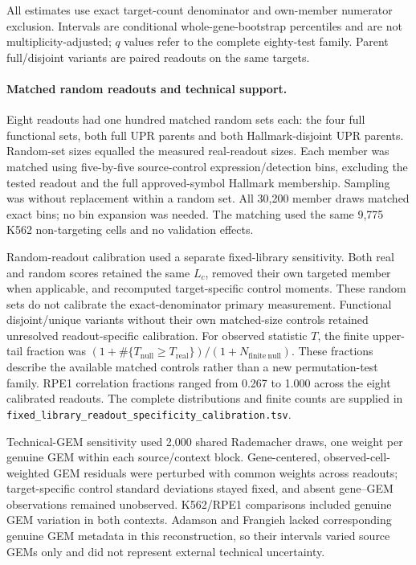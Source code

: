 \documentclass[a4paper,fleqn]{cas-sc}
\makeatletter
\DeclareRobustCommand{\rev}[1]{{\color{red}\def\@citecolor{black}\def\@linkcolor{red}\def\@urlcolor{red}#1}}
\makeatother
\begin{document}
\rev{All estimates use exact target-count denominator and own-member numerator exclusion.} \rev{Intervals are conditional whole-gene-bootstrap percentiles and are not multiplicity-adjusted; $q$ values refer to the complete eighty-test family.} \rev{Parent full/disjoint variants are paired readouts on the same targets.}

\paragraph{\rev{Matched random readouts and technical support.}}
\rev{Eight readouts had one hundred matched random sets each: the four full functional sets, both full UPR parents and both Hallmark-disjoint UPR parents.} \rev{Random-set sizes equalled the measured real-readout sizes.} \rev{Each member was matched using five-by-five source-control expression/detection bins, excluding the tested readout and the full approved-symbol Hallmark membership.} \rev{Sampling was without replacement within a random set.} \rev{All 30,200 member draws matched exact bins; no bin expansion was needed.} \rev{The matching used the same 9,775 K562 non-targeting cells and no validation effects.}

\rev{Random-readout calibration used a separate fixed-library sensitivity.} \rev{Both real and random scores retained the same $L_c$, removed their own targeted member when applicable, and recomputed target-specific control moments.} \rev{These random sets do not calibrate the exact-denominator primary measurement.} \rev{Functional disjoint/unique variants without their own matched-size controls retained unresolved readout-specific calibration.} \rev{For observed statistic $T$, the finite upper-tail fraction was $(1+\#\{T_{\mathrm{null}}\geq T_{\mathrm{real}}\})/(1+N_{\mathrm{finite\ null}})$.} \rev{These fractions describe the available matched controls rather than a new permutation-test family.} \rev{RPE1 correlation fractions ranged from 0.267 to 1.000 across the eight calibrated readouts.} \rev{The complete distributions and finite counts are supplied in \nolinkurl{fixed_library_readout_specificity_calibration.tsv}.}

\rev{Technical-GEM sensitivity used 2,000 shared Rademacher draws, one weight per genuine GEM within each source/context block.} \rev{Gene-centered, observed-cell-weighted GEM residuals were perturbed with common weights across readouts; target-specific control standard deviations stayed fixed, and absent gene--GEM observations remained unobserved.} \rev{K562/RPE1 comparisons included genuine GEM variation in both contexts.} \rev{Adamson and Frangieh lacked corresponding genuine GEM metadata in this reconstruction, so their intervals varied source GEMs only and did not represent external technical uncertainty.}
\end{document}
